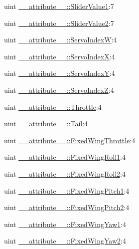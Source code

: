 \begin{DoxyCompactItemize}
\item 
uint \hyperlink{group___config_plugin_gab1ae7499273b5e51087ce2da94c0acab}{\-\_\-\-\_\-attribute\-\_\-\-\_\-\-::\-Slider\-Value1}\-:7
\item 
uint \hyperlink{group___config_plugin_ga86cc56b0247155cf5d5ef0e31d509fed}{\-\_\-\-\_\-attribute\-\_\-\-\_\-\-::\-Slider\-Value2}\-:7
\item 
uint \hyperlink{group___config_plugin_gaffe6aa75cde814b5068ce3494b2abb34}{\-\_\-\-\_\-attribute\-\_\-\-\_\-\-::\-Servo\-Index\-W}\-:4
\item 
uint \hyperlink{group___config_plugin_ga0d592171bd6f7381c2a33dfed5f7c40d}{\-\_\-\-\_\-attribute\-\_\-\-\_\-\-::\-Servo\-Index\-X}\-:4
\item 
uint \hyperlink{group___config_plugin_ga517baa5d4109f802400efeb8a5897b1b}{\-\_\-\-\_\-attribute\-\_\-\-\_\-\-::\-Servo\-Index\-Y}\-:4
\item 
uint \hyperlink{group___config_plugin_ga661c3e27f6844865ea7244fa1363516e}{\-\_\-\-\_\-attribute\-\_\-\-\_\-\-::\-Servo\-Index\-Z}\-:4
\item 
uint \hyperlink{group___config_plugin_ga5045493288e2ee044c68dafe0a02b05c}{\-\_\-\-\_\-attribute\-\_\-\-\_\-\-::\-Throttle}\-:4
\item 
uint \hyperlink{group___config_plugin_ga904a0b19b372c87ddf027435cd9e7723}{\-\_\-\-\_\-attribute\-\_\-\-\_\-\-::\-Tail}\-:4
\item 
uint \hyperlink{group___config_plugin_ga2c5e7e1c1622df1735c63b2a700b1f30}{\-\_\-\-\_\-attribute\-\_\-\-\_\-\-::\-Fixed\-Wing\-Throttle}\-:4
\item 
uint \hyperlink{group___config_plugin_ga674f11a566247fc5041091e940c5d679}{\-\_\-\-\_\-attribute\-\_\-\-\_\-\-::\-Fixed\-Wing\-Roll1}\-:4
\item 
uint \hyperlink{group___config_plugin_ga1d932ff664060c5dd74bb8ec48b4d8ff}{\-\_\-\-\_\-attribute\-\_\-\-\_\-\-::\-Fixed\-Wing\-Roll2}\-:4
\item 
uint \hyperlink{group___config_plugin_ga13162fedce809405cef3920e6e81a8bc}{\-\_\-\-\_\-attribute\-\_\-\-\_\-\-::\-Fixed\-Wing\-Pitch1}\-:4
\item 
uint \hyperlink{group___config_plugin_gaeef8404a3e1d41f57ce18b8e9b351a2d}{\-\_\-\-\_\-attribute\-\_\-\-\_\-\-::\-Fixed\-Wing\-Pitch2}\-:4
\item 
uint \hyperlink{group___config_plugin_ga8282dac2550d491034ca0e0fa8f09c0d}{\-\_\-\-\_\-attribute\-\_\-\-\_\-\-::\-Fixed\-Wing\-Yaw1}\-:4
\item 
uint \hyperlink{group___config_plugin_ga0f87bb28c2fe43ab7616b7322ac21106}{\-\_\-\-\_\-attribute\-\_\-\-\_\-\-::\-Fixed\-Wing\-Yaw2}\-:4

\end{DoxyCompactItemize}
